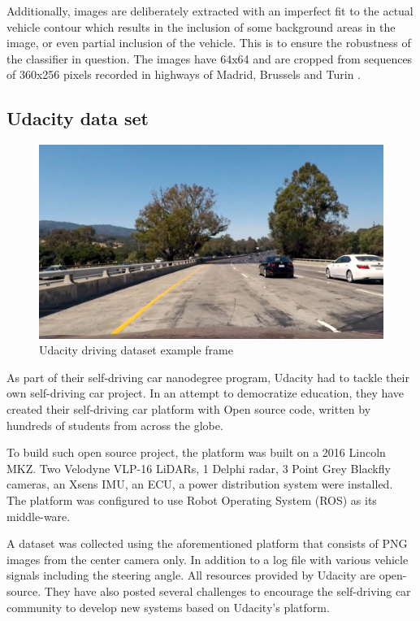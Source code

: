 Additionally, images are deliberately extracted with an imperfect fit to the actual vehicle contour which results in the inclusion of some background areas in the image, or even partial inclusion of the vehicle. This is to ensure the robustness of the classifier in question. The images have 64x64 and are cropped from sequences of 360x256 pixels recorded in highways of Madrid, Brussels and Turin \cite{gti}.

\subsection{Udacity data set}
\begin{figure}[ht]
\includegraphics[trim={0cm 0cm 0cm 0cm},clip,width=\linewidth]{Figures/test1.jpg}
\centering
\caption{Udacity driving dataset example frame}
\label{udacity_data}
\end{figure}
As part of their self-driving car nanodegree program, Udacity had to tackle their own self-driving car project. In an attempt to democratize education, they have created their self-driving car platform with Open source code, written by hundreds of students from across the globe.

To build such open source project, the platform was built on a 2016 Lincoln MKZ. Two Velodyne VLP-16 LiDARs, 1 Delphi radar, 3 Point Grey Blackfly cameras, an Xsens IMU, an ECU, a power distribution system were installed. The platform was configured to use Robot Operating System (ROS) as its middle-ware.

A dataset was collected using the aforementioned platform that consists of PNG images from the center camera only. In addition to a log file with various vehicle signals including the steering angle. All resources provided by Udacity are open-source. They have also posted several challenges to encourage the self-driving car community to develop new systems based on Udacity's platform.


